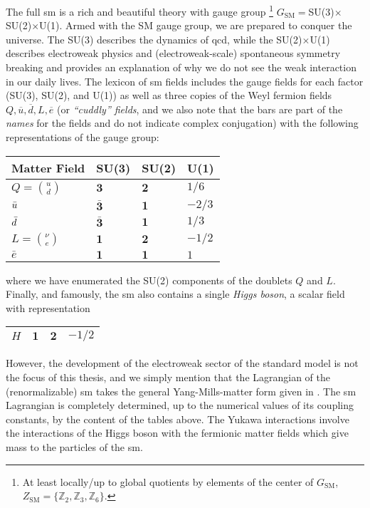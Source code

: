 The full \gls{sm} is a rich and beautiful theory with gauge group%
\footnote{
    At least locally/up to global quotients by elements of the center of \(G_\text{SM}\), \(Z_\text{SM} = \{\mathbb{Z}_2, \mathbb{Z}_3, \mathbb{Z}_6\}\).
}
%
\(G_\text{SM}=\)SU(3)\(\times\)SU(2)\(\times\)U(1).
%
Armed with the SM gauge group, we are prepared to conquer the universe.
%
The SU(3) describes the dynamics of \gls{qcd}, while the SU(2)\(\times\)U(1) describes electroweak physics and (electroweak-scale) spontaneous symmetry breaking and provides an explanation of why we do not see the weak interaction in our daily lives.
%
The lexicon of \gls{sm} fields includes the gauge fields for each factor (SU(3), SU(2), and U(1)) as well as three copies of the Weyl fermion fields \(Q,\overline{u},\overline{d},L,\overline{e}\) (or \textit{``cuddly'' fields}, and we also note that the bars are part of the \textit{names} for the fields and do not indicate complex conjugation) with the following representations of the gauge group:
\begin{center}
 \begin{tabular}{ |p{3cm}||p{3cm}|p{3cm}|p{3cm}|  }
 \hline
 Matter Field & SU(3) & SU(2) & U(1)\\
 \hline\hline
 \(Q = \binom{u}{d}\) & \(\mathbf{3}\)       & \(\mathbf{2}\) & \(1/6\)  \\
 \(\Bar{u}\)          & \(\bar{\mathbf{3}}\) & \(\mathbf{1}\) & \(-2/3\) \\
 \(\Bar{d}\)          & \(\bar{\mathbf{3}}\) & \(\mathbf{1}\) & \(1/3\)  \\
 \(L = \binom{\nu}{e}\) & \(\mathbf{1}\)       & \(\mathbf{2}\) & \(-1/2\) \\
 \(\bar{e}\) & \(\mathbf{1}\)       & \(\mathbf{1}\) & \(1\)            \\
 \hline
\end{tabular}
\end{center}
where we have enumerated the SU(2) components of the doublets \(Q\) and \(L\).
%
Finally, and famously, the \gls{sm} also contains a single \textit{Higgs boson}, a scalar field with representation
\begin{center}
 \begin{tabular}{ |p{3cm}||p{3cm}|p{3cm}|p{3cm}|  }
 \hline
 \(H\)       & \(\mathbf{1}\)       & \(\mathbf{2}\) & \(-1/2\) \\
 \hline
\end{tabular}
\end{center}
However, the development of the electroweak sector of the standard model is not the focus of this thesis, and we simply mention that the Lagrangian of the (renormalizable) \gls{sm} takes the general Yang-Mills-matter form given in .
%
The \gls{sm} Lagrangian is completely determined, up to the numerical values of its coupling constants, by the content of the tables above.
%
The Yukawa interactions involve the interactions of the Higgs boson with the fermionic matter fields which give mass to the particles of the \gls{sm}.


